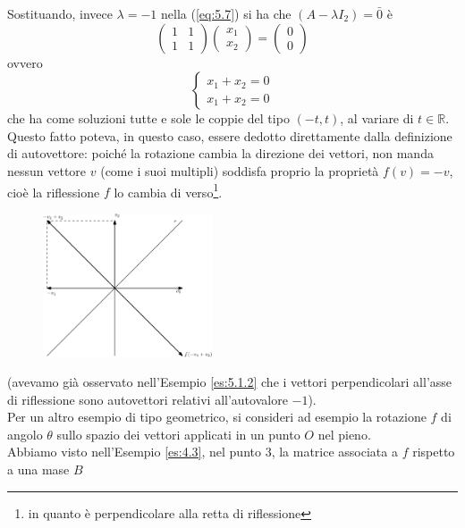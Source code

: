 \documentclass{book}
\begin{document}
Sostituando, invece $\lambda=-1$ nella (\ref{eq:5.7}) si ha che $(A-\lambda I_2)=\bar{0}$ è
\begin{equation*}
  \begin{pmatrix}
    1 & 1\\
    1 & 1
  \end{pmatrix}
  \begin{pmatrix}
    x_1\\
    x_2
  \end{pmatrix}=
  \begin{pmatrix}
    0\\
    0
  \end{pmatrix}
\end{equation*}
ovvero
\begin{equation*}
  \begin{cases}
    x_1+x_2=0\\
    x_1+x_2=0
  \end{cases}
\end{equation*}
che ha come soluzioni tutte e sole le coppie del tipo $(-t,t)$, al variare di $t\in \mathds{R}$.\\
Questo fatto poteva, in questo caso, essere dedotto direttamente dalla definizione di autovettore: poiché la
rotazione cambia la direzione dei vettori, non manda nessun vettore $v$ (come i suoi multipli) soddisfa proprio
la proprietà $f(v)=-v$, cioè la riflessione $f$ lo cambia di verso\footnote{in quanto è perpendicolare alla retta
  di riflessione}.
\clearpage
\begin{figure}[ht]
  \centering
  \includegraphics[width=5cm]{img/finiti/imgex5-2-2.eps}
\end{figure}
(avevamo già osservato nell'Esempio \ref{es:5.1.2} che i vettori perpendicolari all'asse di riflessione sono
autovettori relativi all'autovalore $-1$).\\
Per un altro esempio di tipo geometrico, si consideri ad esempio la rotazione $f$ di angolo $\theta$ sullo spazio
dei vettori applicati in un punto $O$ nel pieno.\\
Abbiamo visto nell'Esempio \ref{es:4.3}, nel punto 3, la matrice associata a $f$ rispetto a una mase $B$
\end{document}

